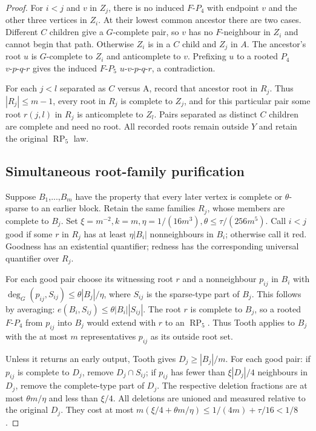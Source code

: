 \documentclass[11pt,a4paper]{article}
\theoremstyle{definition}
\theoremstyle{remark}
\numberwithin{equation}{section}
\begin{document}
\begin{proof}
For \(i<j\) and \(v\) in \(Z_{j}\), there is no induced \(F\text{-}P_{4}\) with endpoint \(v\) and the other three vertices in \(Z_{i}\). At their lowest common ancestor there are two cases. Different \(C\) children give a \(G\)-complete pair, so \(v\) has no \(F\)-neighbour in \(Z_{i}\) and cannot begin that path. Otherwise \(Z_{i}\) is in a \(C\) child and \(Z_{j}\) in \(A\). The ancestor's root \(u\) is \(G\)-complete to \(Z_{i}\) and anticomplete to \(v\). Prefixing \(u\) to a rooted \(P_{4}\) \(v\text{-}p\text{-}q\text{-}r\) gives the induced \(F\text{-}P_{5}\) \(u\text{-}v\text{-}p\text{-}q\text{-}r\), a contradiction.

For each \(j<l\) separated as \(C\) versus A, record that ancestor root in \(R_{j}\). Thus \(|R_{j}|\le\allowbreak m-1\), every root in \(R_{j}\) is complete to \(Z_{j}\), and for this particular pair some root \(r(j,\allowbreak l)\) in \(R_{j}\) is anticomplete to \(Z_{l}\). Pairs separated as distinct \(C\) children are complete and need no root. All recorded roots remain outside \(Y\) and retain the original \(\operatorname{RP}_{5}\) law.
\subsection{Simultaneous root-family purification}\label{subsec:rp5-purification}
Suppose \(B_{1}\),...,\(B_{m}\) have the property that every later vertex is complete or \(\theta\)-sparse to an earlier block. Retain the same families \(R_{j}\), whose members are complete to \(B_{j}\). Set \(\xi=m^{-2},\allowbreak  k=m,\allowbreak  \eta=1/(16m^{3}),\allowbreak  \theta\le\allowbreak \tau/(256m^{5})\). Call \(i<j\) good if some \(r\) in \(R_{j}\) has at least \(\eta|B_{i}|\) nonneighbours in \(B_{i}\); otherwise call it red. Goodness has an existential quantifier; redness has the corresponding universal quantifier over \(R_{j}\).

For each good pair choose its witnessing root \(r\) and a nonneighbour \(p_{ij}\) in \(B_{i}\) with \(\deg _{G}(p_{ij},\allowbreak S_{ij})\le\allowbreak \theta|B_{j}|/\eta\), where \(S_{ij}\) is the sparse-type part of \(B_{j}\). This follows by averaging: \(e(B_{i},\allowbreak S_{ij})\le\allowbreak \theta|B_{i}||S_{ij}|\). The root \(r\) is complete to \(B_{j}\), so a rooted \(F\text{-}P_{4}\) from \(p_{ij}\) into \(B_{j}\) would extend with \(r\) to an \(\operatorname{RP}_{5}\). Thus Tooth applies to \(B_{j}\) with the at most \(m\) representatives \(p_{ij}\) as its outside root set.

Unless it returns an early output, Tooth gives \(D_{j}\ge\allowbreak |B_{j}|/m\). For each good pair: if \(p_{ij}\) is complete to \(D_{j}\), remove \(D_{j} \cap  S_{ij}\); if \(p_{ij}\) has fewer than \(\xi|D_{j}|/4\) neighbours in \(D_{j}\), remove the complete-type part of \(D_{j}\). The respective deletion fractions are at most \(\theta m/\eta\) and less than \(\xi/4\). All deletions are unioned and measured relative to the original \(D_{j}\). They cost at most \(m(\xi/4+\theta m/\eta)\le\allowbreak 1/(4m)+\tau/16<1/8\).


\end{proof}
\end{document}
